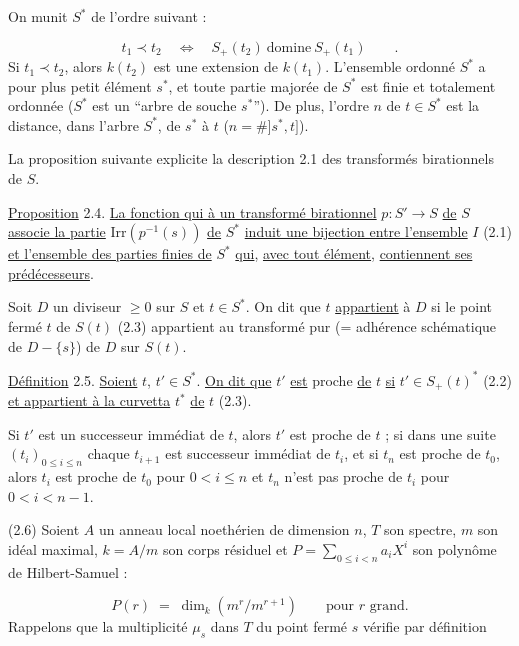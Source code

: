 On munit $S^*$ de l'ordre suivant :

\begin{equation*}
t_1 \prec t_2 \quad \Longleftrightarrow \quad S_+(t_2) \ \mbox{domine} \ S_+(t_1) \qquad .
\end{equation*}
Si $t_1 \prec t_2$, alors $k(t_2)$ est une extension de $k(t_1)$. L'ensemble ordonné $S^*$ a pour plus petit élément $s^*$, et toute partie majorée de $S^*$ est finie et totalement ordonnée ($S^*$ est un ``arbre de souche $s^*$''). De plus, l'ordre $n$ de $t \in S^*$ est la distance, dans l'arbre $S^*$, de $s^*$ à $t$ ($n = \#]s^*,t]$).

La proposition suivante explicite la description 2.1 des transformés birationnels de $S$.

\underline{Proposition} 2.4. \underline{La fonction qui à un transformé birationnel} $p : S' \to S$ \underline{de} $S$ \underline{associe la partie} $\mathrm{Irr}(p^{-1}(s))$ \underline{de} $S^*$ \underline{induit une bijection entre l'ensemble} $I$ (2.1) \underline{et l'ensemble des parties finies de} $S^*$ \underline{qui}, \underline{avec tout élément},
\underline{contiennent ses prédécesseurs}.

Soit $D$ un diviseur $\geq 0$ sur $S$ et $t \in S^*$. On dit que $t$ \underline{appartient} à $D$ si le point fermé $t$ de $S(t)$ (2.3) appartient au transformé pur (= adhérence schématique de $D - \{s\}$) de $D$ sur $S(t)$.

\underline{Définition} 2.5. \underline{Soient} $t$, $t' \in S^*$. \underline{On dit que} $t'$ \underline{est} proche \underline{de} $t$ \underline{si} $t' \in S_+(t)^*$ (2.2) \underline{et appartient à la curvetta} $t^*$ \underline{de} $t$ (2.3).

Si $t'$ est un successeur immédiat de $t$, alors $t'$ est proche de $t$ ; si dans une suite $(t_i)_{0 \leq i \leq n}$ chaque $t_{i+1}$ est successeur immédiat de $t_i$, et si $t_n$ est proche de $t_0$, alors $t_i$ est proche de $t_0$ pour $0 < i \leq n$ et $t_n$ n'est pas proche de $t_i$ pour $0 < i < n-1$.

(2.6)  Soient $A$ un anneau local noethérien de dimension $n$, $T$ son spectre, $m$ son idéal maximal, $k = A/m$ son corps résiduel et $P = \sum_{0 \leq i < n} a_i X^i$ son polynôme de Hilbert-Samuel :

\begin{equation*}
P(r) \;=\; \dim_k(m^r/m^{r+1}) \qquad \text{pour } r \text{ grand.}
\end{equation*}
Rappelons que la multiplicité $\mu_s$ dans $T$ du point fermé $s$ vérifie par définition

